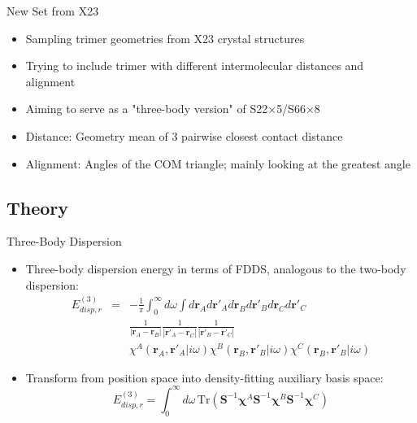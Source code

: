 \documentclass{beamer}
\begin{document}
        \begin{frame}{New Set from X23}
            \begin{itemize}
                \item Sampling trimer geometries from X23 crystal structures
                \item Trying to include trimer with different intermolecular distances and alignment 
                \item Aiming to serve as a "three-body version" of S22$\times$5/S66$\times$8
                \item Distance: Geometry mean of 3 pairwise closest contact distance
                \item Alignment: Angles of the COM triangle; mainly looking at the greatest angle
            \end{itemize}
        \end{frame}

    \subsection{Theory}

        \begin{frame}{Three-Body Dispersion}
            \begin{itemize}
                \item Three-body dispersion energy in terms of FDDS, analogous to the two-body dispersion:
                \begin{eqnarray}
                    \nonumber
                    E_{disp,r}^{(3)} &=& -\frac{1}{\pi}\int_0^\infty d\omega \int d\mathbf{r}_A d\mathbf{r}'_A d\mathbf{r}_B d\mathbf{r}'_B d\mathbf{r}_C d\mathbf{r}'_C \\ \nonumber
                    & & \frac{1}{|\mathbf{r}_A-\mathbf{r}_B|} \frac{1}{|\mathbf{r}'_A-\mathbf{r}_C|} \frac{1}{|\mathbf{r}'_B-\mathbf{r}'_C|} \\ \nonumber
                    & & \chi^A\left(\mathbf{r}_A,\mathbf{r}'_A|i\omega\right)\chi^B\left(\mathbf{r}_B,\mathbf{r}'_B|i\omega\right)\chi^C\left(\mathbf{r}_B,\mathbf{r}'_B|i\omega\right)
                \end{eqnarray}
                \item Transform from position space into density-fitting auxiliary basis space:
                $$E_{disp,r}^{(3)} = \int_0^\infty d\omega\,\mathrm{Tr}\left(\mathbf{S}^{-1}\boldsymbol{\chi}^A\mathbf{S}^{-1}\boldsymbol{\chi}^B\mathbf{S}^{-1}\boldsymbol{\chi}^C\right)$$
            \end{itemize}
        \end{frame}
\end{document}
